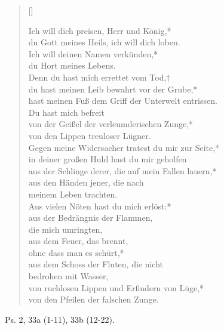 \begin{verse}[\versewidth]

Ich will dich preisen, Herr und König,*\\
du Gott meines Heils, ich will dich loben.\\
\vin Ich will deinen Namen verkünden,*\\
\vin du Hort meines Lebens.\\
Denn du hast mich errettet vom Tod,†\\
du hast meinen Leib bewahrt vor der Grube,*\\
hast meinen Fuß dem Griff der Unterwelt entrissen.\\
\vin Du hast mich befreit\\ 
\vin von der Geißel der verleumderischen Zunge,*\\
\vin von den Lippen treuloser Lügner.\\
Gegen meine Widersacher tratest du mir zur Seite,*\\
in deiner großen Huld hast du mir geholfen\\
\vin aus der Schlinge derer, die auf mein Fallen lauern,*\\
\vin aus den Händen jener, die nach\\ \vin meinem Leben trachten.\\
Aus vielen Nöten hast du mich erlöst:*\\
aus der Bedrängnis der Flammen,\\  die mich umringten,\\
\vin aus dem Feuer, das brennt, \\ \vin ohne dass man es schürt,*\\
\vin aus dem Schoss der Fluten, die nicht\\ \vin bedrohen mit Wasser,\\
von ruchlosen Lippen und Erfindern von Lüge,*\\
von den Pfeilen der falschen Zunge.\\

\end{verse}


Ps. 2, 33a (1-11), 33b (12-22).\\


